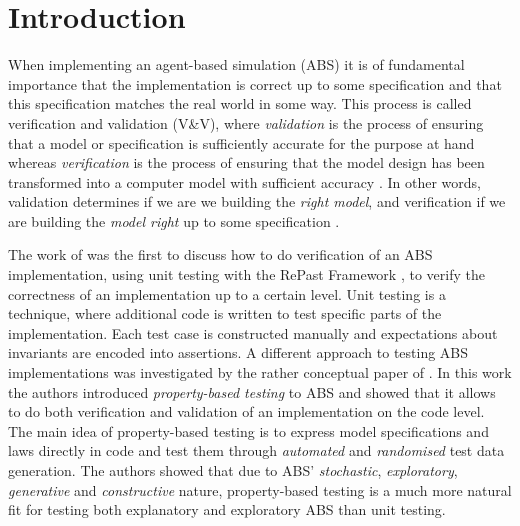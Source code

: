 \section{Introduction}
\label{sec:introduction}
When implementing an agent-based simulation (ABS) it is of fundamental importance that the implementation is correct up to some specification and that this specification matches the real world in some way. This process is called verification and validation (V\&V), where \textit{validation} is the process of ensuring that a model or specification is sufficiently accurate for the purpose at hand whereas \textit{verification} is the process of ensuring that the model design has been transformed into a computer model with sufficient accuracy \citep{robinson_simulation:_2014}. In other words, validation determines if we are we building the \textit{right model}, and verification if we are building the \textit{model right} up to some specification \citep{balci_verification_1998}.

The work of \cite{collier_test-driven_2013} was the first to discuss how to do verification of an ABS implementation, using unit testing with the RePast Framework \citep{north_complex_2013}, to verify the correctness of an implementation up to a certain level. Unit testing is a technique, where additional code is written to test specific parts of the implementation. Each test case is constructed manually and expectations about invariants are encoded into assertions. A different approach to testing ABS implementations was investigated by the rather conceptual paper of \cite{thaler_show_2019}. In this work the authors introduced \textit{property-based testing} to ABS and showed that it allows to do both verification and validation of an implementation on the code level. The main idea of property-based testing is to express model specifications and laws directly in code and test them through \textit{automated} and \textit{randomised} test data generation. The authors showed that due to ABS' \textit{stochastic}, \textit{exploratory}, \textit{generative} and \textit{constructive} nature, property-based testing is a much more natural fit for testing both explanatory and exploratory ABS than unit testing. 

